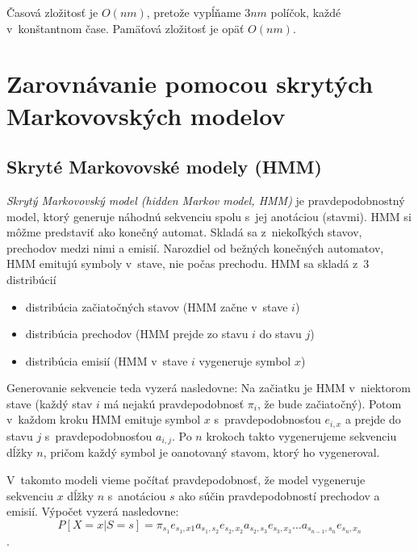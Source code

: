 Časová zložitosť je $O(nm)$, pretože vypĺňame $3nm$ políčok, každé v~konštantnom čase. Pamäťová zložitosť je opäť $O(nm)$.

\cite{durbin}

\section[Zarovnávanie s~pHMM]{Zarovnávanie pomocou skrytých Markovovských modelov}
\label{sec:hmm-alignment}

\subsection{Skryté Markovovské modely (HMM)}
\textit{Skrytý Markovovský model (hidden Markov model, HMM)} je pravdepodobnostný model, ktorý generuje náhodnú sekvenciu spolu s~jej anotáciou (stavmi). HMM si môžme predstaviť ako konečný automat. Skladá sa z~niekoľkých stavov, prechodov medzi nimi a emisií. Narozdiel od bežných konečných automatov, HMM emitujú symboly v~stave, nie počas prechodu.
HMM sa skladá z~3 distribúcií
\begin{itemize}
\item distribúcia začiatočných stavov (HMM začne v~stave $i$)
\item distribúcia prechodov (HMM prejde zo stavu $i$ do stavu $j$)
\item distribúcia emisií (HMM v~stave $i$ vygeneruje symbol $x$)
\end{itemize}

Generovanie sekvencie teda vyzerá nasledovne: Na začiatku je HMM v~niektorom stave (každý stav $i$ má nejakú pravdepodobnosť $\pi_i$, že bude začiatočný). Potom v~každom kroku HMM emituje symbol $x$ s~pravdepodobnosťou $e_{i, x}$ a prejde do stavu $j$ s~pravdepodobnosťou $a_{i,j}$. Po $n$ krokoch takto vygenerujeme sekvenciu dĺžky $n$, pričom každý symbol je oanotovaný stavom, ktorý ho vygeneroval.

V~takomto modeli vieme počítať pravdepodobnosť, že model vygeneruje sekvenciu $x$ dĺžky $n$ s~anotáciou $s$ ako súčin pravdepodobností prechodov a emisií.
Výpočet vyzerá nasledovne: $$P[X=x | S=s] = \pi_{s_1} e_{s_1,x1} a_{s_1,s_2} e_{s_2,x_2} a_{s_2,s_3} e_{s_3,x_3}\dots a_{s_{n-1},s_n} e_{s_n,x_n}$$.
\cite{skripta, durbin}



